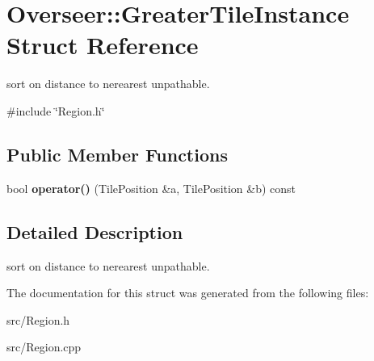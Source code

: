 \hypertarget{structOverseer_1_1GreaterTileInstance}{}\section{Overseer\+:\+:Greater\+Tile\+Instance Struct Reference}
\label{structOverseer_1_1GreaterTileInstance}


sort on distance to nerearest unpathable.  




{\ttfamily \#include \char`\"{}Region.\+h\char`\"{}}

\subsection*{Public Member Functions}
\begin{DoxyCompactItemize}
\item 
bool {\bfseries operator()} (Tile\+Position \&a, Tile\+Position \&b) const \hypertarget{structOverseer_1_1GreaterTileInstance_ad2cc6e19a01f100bb441ac1044b9147c}{}\label{structOverseer_1_1GreaterTileInstance_ad2cc6e19a01f100bb441ac1044b9147c}

\end{DoxyCompactItemize}


\subsection{Detailed Description}
sort on distance to nerearest unpathable. 

The documentation for this struct was generated from the following files\+:\begin{DoxyCompactItemize}
\item 
src/Region.\+h\item 
src/Region.\+cpp\end{DoxyCompactItemize}
